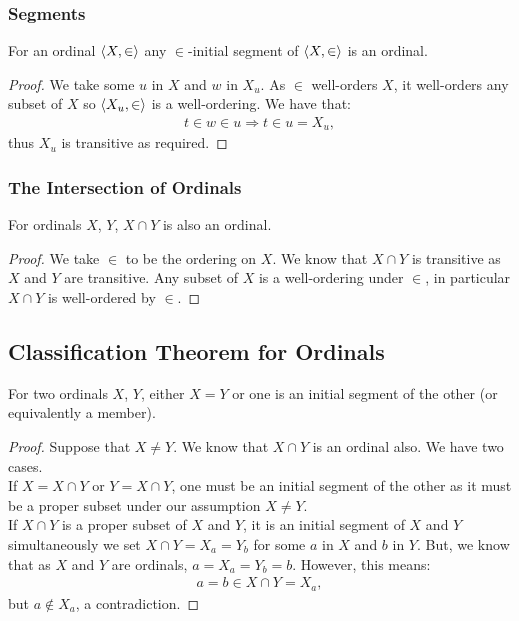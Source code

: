 \subsubsection{Segments}

For an ordinal $\langle X, \in \rangle$ any $\in$-initial segment of 
$\langle X, \in \rangle$ is an ordinal.

\begin{proof}
    We take some $u$ in $X$ and $w$ in $X_u$. 
    As $\in$ well-orders $X$, it well-orders
    any subset of $X$ so $\langle X_u, \in \rangle$ is a well-ordering. 
    We have that: \begin{align*}
        t \in w \in u \Longrightarrow t \in u = X_u,
    \end{align*} thus $X_u$ is transitive as required.
\end{proof}

\subsubsection{The Intersection of Ordinals}

For ordinals $X$, $Y$, $X \cap Y$ is also an ordinal.

\begin{proof}
    We take $\in$ to be the ordering on $X$.
    We know that $X \cap Y$ is transitive as $X$ and $Y$
    are transitive. Any subset of $X$ is a well-ordering
    under $\in$, in particular $X \cap Y$
    is well-ordered by $\in$. 
\end{proof}

\subsection{Classification Theorem for Ordinals}

For two ordinals $X$, $Y$, either $X = Y$ or one is an initial
segment of the other (or equivalently a member).

\begin{proof}
    Suppose that $X \neq Y$. We know that $X \cap Y$ is an ordinal
    also. We have two cases.
    \\[\baselineskip]
    If $X = X \cap Y$ or $Y = X \cap Y$, one must
    be an initial segment of the other as it must
    be a proper subset under our assumption $X \neq Y$.
    \\[\baselineskip]
    If $X \cap Y$ is a proper subset of $X$ and $Y$,
    it is an initial segment of $X$ and $Y$ simultaneously
    we set $X \cap Y = X_a = Y_b$ for some $a$ in $X$ and
    $b$ in $Y$. But, we know that as $X$ and $Y$ are ordinals,
    $a = X_a = Y_b = b$. However, this means: \begin{align*}
        a = b \in X \cap Y = X_a,
    \end{align*} but $a \notin X_a$, a contradiction.
\end{proof}
